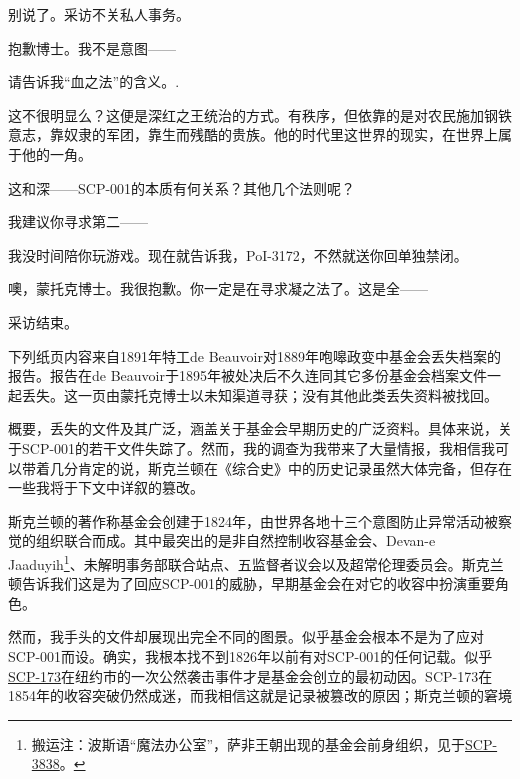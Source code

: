 \begin{scpbox}
别说了。采访不关私人事务。

抱歉博士。我不是意图——

请告诉我“血之法”的含义。.

这不很明显么？这便是深红之王统治的方式。有秩序，但依靠的是对农民施加钢铁意志，靠奴隶的军团，靠生而残酷的贵族。他的时代里这世界的现实，在世界上属于他的一角。

这和深——SCP-001的本质有何关系？其他几个法则呢？

我建议你寻求第二——

我没时间陪你玩游戏。现在就告诉我，PoI-3172，不然就送你回单独禁闭。

噢，蒙托克博士。我很抱歉。你一定是在寻求凝之法了。这是全——

采访结束。


\end{scpbox}

\hr

下列纸页内容来自1891年特工de Beauvoir对1889年咆嗥政变中基金会丢失档案的报告。报告在de Beauvoir于1895年被处决后不久连同其它多份基金会档案文件一起丢失。这一页由蒙托克博士以未知渠道寻获；没有其他此类丢失资料被找回。

\begin{scpbox}

概要，丢失的文件及其广泛，涵盖关于基金会早期历史的广泛资料。具体来说，关于SCP-001的若干文件失踪了。然而，我的调查为我带来了大量情报，我相信我可以带着几分肯定的说，斯克兰顿在《综合史》中的历史记录虽然大体完备，但存在一些我将于下文中详叙的篡改。

斯克兰顿的著作称基金会创建于1824年，由世界各地十三个意图防止异常活动被察觉的组织联合而成。其中最突出的是非自然控制收容基金会、Devan-e Jaaduyih\footnote{搬运注：波斯语“魔法办公室”，萨非王朝出现的基金会前身组织，见于\hyperref[chap:SCP-3838]{SCP-3838}。}、未解明事务部联合站点、五监督者议会以及超常伦理委员会。斯克兰顿告诉我们这是为了回应SCP-001的威胁，早期基金会在对它的收容中扮演重要角色。

然而，我手头的文件却展现出完全不同的图景。似乎基金会根本不是为了应对SCP-001而设。确实，我根本找不到1826年以前有对SCP-001的任何记载。似乎\hyperref[chap:SCP-173]{SCP-173}在纽约市的一次公然袭击事件才是基金会创立的最初动因。SCP-173在1854年的收容突破仍然成迷，而我相信这就是记录被篡改的原因；斯克兰顿的窘境

\end{scpbox}

